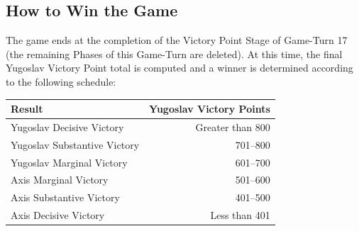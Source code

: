 \subsection{How to Win the Game}\label{sec:15.5}

The game ends at the completion of the Victory Point Stage of Game-Turn 17 (the
remaining Phases of this Game-Turn are deleted). At this time, the final
Yugoslav Victory Point total is computed and a winner is determined according
to the following schedule:

\begin{center}
\begin{tabularx}{\linewidth}{@{}Xr@{}}
  \toprule
  Result & Yugoslav Victory Points \\
  \midrule
  Yugoslav Decisive Victory & Greater than 800 \\
  Yugoslav Substantive Victory & 701--800 \\
  Yugoslav Marginal Victory & 601--700 \\
  Axis Marginal Victory & 501--600 \\
  Axis Substantive Victory & 401--500 \\
  Axis Decisive Victory & Less than 401 \\
  \bottomrule
\end{tabularx}
\end{center}
